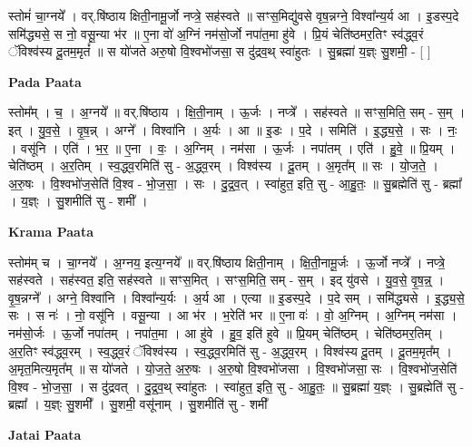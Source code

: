 \documentclass[17pt]{extarticle}
\begin{document}
स्तोमं॑ चा॒ग्नये᳚ । वर्.षि॑ष्ठाय क्षिती॒नामू॒र्जो नप्त्रे॒ सह॑स्वते ॥ सꣳस॒मिद्यु॑वसे वृष॒न्नग्ने॒ विश्वा᳚न्य॒र्य आ । इ॒डस्प॒दे समि॑द्ध्यसे॒ स नो॒ वसू॒न्या भ॑र ॥ ए॒ना वो॑ अ॒ग्निं नम॑सो॒र्जो नपा॑त॒मा हु॑वे । प्रि॒यं चेति॑ष्ठमर॒तिꣳ स्व॑द्ध्व॒रं ॅविश्व॑स्य दू॒तम॒मृतं᳚ ॥ स यो॑जते अरु॒षो वि॒श्वभो॑जसा॒ स दु॑द्रव॒थ् स्वा॑हुतः । सु॒ब्रह्मा॑ य॒ज्ञ्ः सु॒शमी॒ - [  ] \newline

\textbf{Pada Paata} \newline

स्तोम᳚म् । च॒ । अ॒ग्नये᳚ ॥ वर्.षि॑ष्ठाय । क्षि॒ती॒नाम् । ऊ॒र्जः । नप्त्रे᳚ । सह॑स्वते ॥ सꣳस॒मिति॒ सम् - स॒म् । इत् । यु॒व॒से॒ । वृ॒ष॒न्न् । अग्ने᳚ । विश्वा॑नि । अ॒र्यः । आ ॥ इ॒डः । प॒दे । समिति॑ । इ॒द्ध्य॒से॒ । सः । नः॒ । वसू॑नि । एति॑ । भ॒र॒ ॥ ए॒ना । वः॒ । अ॒ग्निम् । नम॑सा । ऊ॒र्जः । नपा॑तम् । एति॑ । हु॒वे॒ ॥ प्रि॒यम् । चेति॑ष्ठम् । अ॒र॒तिम् । स्व॒द्ध्व॒रमिति॑ सु - अ॒द्ध्व॒रम् । विश्व॑स्य । दू॒तम् । अ॒मृत᳚म् ॥ सः । यो॒ज॒ते॒ । अ॒रु॒षः । वि॒श्वभो॑ज॒सेति॑ वि॒श्व - भो॒ज॒सा॒ । सः । दु॒द्र॒व॒त् । स्वा॑हुत॒ इति॒ सु - आ॒हु॒तः॒ ॥ सु॒ब्रह्मेति॑ सु - ब्रह्मा᳚ । य॒ज्ञ्ः । सु॒शमीति॑ सु - शमी᳚ ।  \newline


\textbf{Krama Paata} \newline

स्तोम॑म् च । चा॒ग्नये᳚ । अ॒ग्नय॒ इत्य॒ग्नये᳚ ॥ वर्.षि॑ष्ठाय क्षिती॒नाम् । क्षि॒ती॒नामू॒र्जः । ऊ॒र्जो नप्त्रे᳚ । नप्त्रे॒ सह॑स्वते । सह॑स्वत॒ इति॒ सह॑स्वते ॥ सꣳस॒मित् । सꣳस॒मिति॒ सम् - स॒म् । इद् यु॑वसे । यु॒व॒से॒ वृ॒ष॒न्न्॒ । वृ॒ष॒न्नग्ने᳚ । अग्ने॒ विश्वा॑नि । विश्वा᳚न्य॒र्यः । अ॒र्य आ । एत्या ॥ इ॒डस्प॒दे । प॒दे सम् । समि॑द्ध्यसे । इ॒द्ध्य॒से॒ सः । स नः॑ । नो॒ वसू॑नि । वसू॒न्या । आ भ॑र । भ॒रेति॑ भर ॥ ए॒ना वः॑ । वो॒ अ॒ग्निम् । अ॒ग्निम् नम॑सा । नम॑सो॒र्जः । ऊ॒र्जो नपा॑तम् । नपा॑त॒मा । आ हु॑वे । हु॒व॒ इति॑ हुवे ॥ प्रि॒यम् चेति॑ष्ठम् । चेति॑ष्ठमर॒तिम् । अ॒र॒तिꣳ स्व॑द्ध्व॒रम् । स्व॒द्ध्व॒रं ॅविश्व॑स्य । स्व॒द्ध्व॒रमिति॑ सु - अ॒द्ध्व॒रम् । विश्व॑स्य दू॒तम् । दू॒तम॒मृत᳚म् । अ॒मृत॒मित्य॒मृत᳚म् ॥ स यो॑जते । यो॒ज॒ते॒ अ॒रु॒षः । अ॒रु॒षो वि॒श्वभो॑जसा । वि॒श्वभो॑जसा॒ सः । वि॒श्वभो॑ज॒सेति॑ वि॒श्व - भो॒ज॒सा॒ । स दु॑द्रवत् । दु॒द्र॒व॒थ् स्वा॑हुतः । स्वा॑हुत॒ इति॒ सु - आ॒हु॒तः॒ ॥ सु॒ब्रह्मा॑ य॒ज्ञ्ः । सु॒ब्रह्मेति॑ सु - ब्रह्मा᳚ । य॒ज्ञ्ः सु॒शमी᳚ । सु॒शमी॒ वसू॑नाम् । सु॒शमीति॑ सु - शमी᳚ \newline

\textbf{Jatai Paata} \newline
\end{document}
